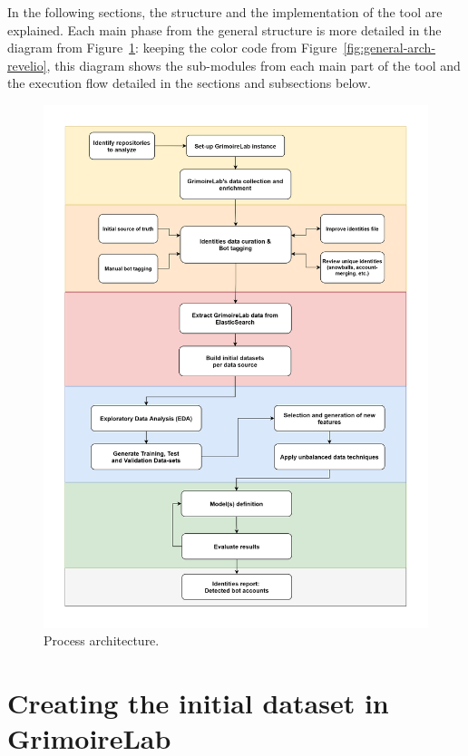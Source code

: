 \documentclass[a4paper, 12pt]{book}
\begin{document}
In the following sections, the structure and the implementation of the tool are explained. Each main phase from the general structure is more detailed in the diagram from Figure~\ref{fig:process-arch}: keeping the color code from Figure~\ref{fig:general-arch-revelio}, this diagram shows the sub-modules from each main part of the tool and the execution flow detailed in the sections and subsections below.

\begin{figure}
  \centering
  \includegraphics[width=16.5cm, keepaspectratio]{img/sections-architechture-revelio.png}
  \caption{Process architecture.}
  \label{fig:process-arch}
\end{figure}

\section{Creating the initial dataset in GrimoireLab} 
\label{sec:creating-dataset}
\end{document}
